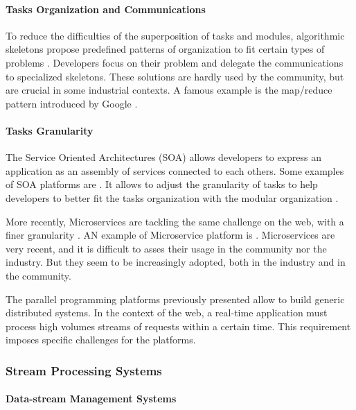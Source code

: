 \paragraph{Tasks Organization and Communications}

To reduce the difficulties of the superposition of tasks and modules, algorithmic skeletons propose predefined patterns of organization to fit certain types of problems \cite{Cole1988, Dean2008, McCool2010, Gonzalez-Velez2010}.
Developers focus on their problem and delegate the communications to specialized skeletons.
These solutions are hardly used by the community, but are crucial in some industrial contexts.
A famous example is the map/reduce pattern introduced by Google \cite{Dean2008}.

\paragraph{Tasks Granularity}

The Service Oriented Architectures (SOA) allows developers to express an application as an assembly of services connected to each others.
Some examples of SOA platforms are .
It allows to adjust the granularity of tasks to help developers to better fit the tasks organization with the modular organization \cite{Adam2008}.

More recently, Microservices are tackling the same challenge on the web, with a finer granularity \cite{Fernandez-Villamor2010,Fowler2014,Namiot2014}.
AN example of Microservice platform is .
Microservices are very recent, and it is difficult to asses their usage in the community nor the industry.
But they seem to be increasingly adopted, both in the industry and in the community.

\separator

The parallel programming platforms previously presented allow to build generic distributed systems.
In the context of the web, a real-time application must process high volumes streams of requests within a certain time.
This requirement imposes specific challenges for the platforms.

\subsubsection{Stream Processing Systems}

\paragraph{Data-stream Management Systems}

